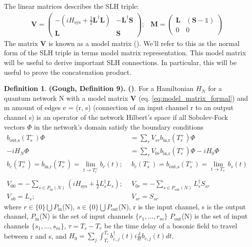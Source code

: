 \documentclass[a4paper]{article}
\theoremstyle{definition}
\newtheorem{definition}{Definition}[section]
\begin{document}
The linear matrices describes the SLH triple:
\begin{align}
    \textbf{V} = \begin{pmatrix}
-(iH_{\text{sys}} + \frac{1}{2}\textbf{L}^\dagger \textbf{L}) & - \textbf{L}^\dagger \textbf{S} \\
\textbf{L} & \textbf{S}
\end{pmatrix}; &  \textbf{M} = \begin{pmatrix}
\textbf{L} & (\textbf{S}-\mathbb{1}) \\
0 & 0
\end{pmatrix} \label{eq:model_matrix_formal}
\end{align}
The matrix \textbf{V} is known as a model matrix (\citealp{Gough_2008, Nurdin_2010}). We'll refer to this as the normal form of the SLH triple in terms model matrix representation. This model matrix will be useful to derive important SLH connections. In particular, this will be useful to prove the concatenation product.

\begin{definition}
\textbf{(Gough, Definition 9). (\citealp{Gough_2008})}. For a Hamiltonian $H_N$ for a quantum network N with a model matrix \textbf{V} (eq. \ref{eq:model_matrix_formal}) and m amount of edges e = (r, s) (connection of an input channel r to an output channel s) is an operator of the network Hilbert's space if all Sobolev-Fock vectors $\Phi$ in the network's domain satisfy the boundary conditions 
\begin{align}
    b_{\text{out,s}}(T^-_s) \Phi & = \sum_r V_{sr} b_{\text{in,r}}(T^+_r) \Phi \label{eq:model_input/output_relation} \\
    -iH_N \Phi & = \sum_r V_{0r} b_{\text{in,r}}(T^+_r) \Phi - iH_0 \Phi \label{eq:model_hamiltonian} \\
    b_{e}(T^+_r) = b_{\text{in,r}}(T^+_r) =  \lim_{t\to T^+_r} b_{r}(t); \ & \ b_{e}(T^-_s) = b_{\text{out,s}}(T^-_s) = \lim_{t\to T^-_s} b_{s}(t) \nonumber \\
        & \nonumber \\
    V_{00} =  -\sum_{s\in P_{\text{in}}(N)} (iH_{\text{sys}} + \frac{1}{2}L_s^\dagger L_s); \ & \ V_{0r} = - \sum_{s\in P_{\text{out}}(N)} L_s^\dagger S_{sr} \nonumber \\
    V_{s0} = L_s; \ & \ V_{sr} = S_{sr} \nonumber
\end{align}
where $r \in \{0\} \bigcup P_{\text{in}}$(N), $s \in \{0\} \bigcup P_{\text{out}}$(N), r is the input channel, s is the output channel, $ P_{\text{in}}$(N) is the set of input channels $\{r_1, \dots, r_m\}$ $ P_{\text{out}}$(N) is the set of input channels $\{s_1, \dots, s_m\}$, $\tau = T_s - T_r$ be the time delay of a bosonic field to travel between r and s, and $H_0 = \sum_j \int_{T_r}^{T_s} b^\dagger_{e,j}(t)i\frac{\delta}{\delta t}b_{e,j}(t)dt$. 

\end{definition}
\end{document}
